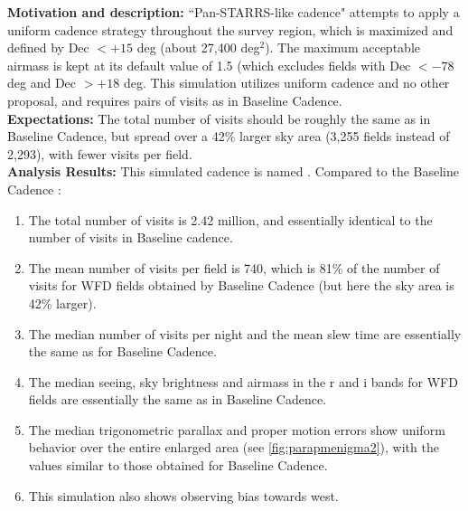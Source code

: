 
{\bf Motivation and description:} ``Pan-STARRS-like cadence" attempts
to apply a uniform cadence strategy throughout the survey region,
which is maximized and defined by Dec $< +15$ deg (about 27,400
deg$^2$). The maximum acceptable airmass is kept at its default value
of 1.5 (which excludes fields with Dec $< -78$ deg and Dec $> +18$
deg. This simulation utilizes uniform cadence and no other proposal,
and requires pairs of visits as in Baseline Cadence. \\

{\bf Expectations:} The total number of visits should be roughly the
same as in Baseline Cadence, but spread over a 42\% larger sky area
(3,255 fields instead of 2,293), with fewer visits per field. \\

{\bf Analysis Results:}  This simulated cadence is named .
Compared to the Baseline Cadence :
\begin{enumerate}
\item The total number of visits is 2.42 million, and essentially identical to the
number of visits in Baseline cadence.
\item
The mean number of visits per field is 740, which is 81\% of the number of visits %
for WFD fields obtained by Baseline Cadence (but here the sky area is 42\% larger).
\item The median number of visits per night and the mean slew time are
  essentially the same as for Baseline Cadence.
\item The median seeing, sky brightness and airmass in the r and i
  bands for WFD fields are essentially the same as in Baseline
  Cadence.
\item The median trigonometric parallax and proper motion errors show
  uniform behavior over the entire enlarged area (see
  \autoref{fig:parapmenigma2}), with the values similar to those
  obtained for Baseline Cadence.
\item This simulation also shows observing bias towards west.
\end{enumerate}

